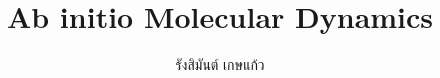 



\let\cleardoublepage\clearpage

\title{Ab initio Molecular Dynamics}
\author{รังสิมันต์ เกษแก้ว}



% 


\frontmatter





\pagestyle{fancy} %

\mainmatter


\appendix
\begin{appendices}
\renewcommand{\thesection}{\arabic{section}} %
\end{appendices}

\backmatter





